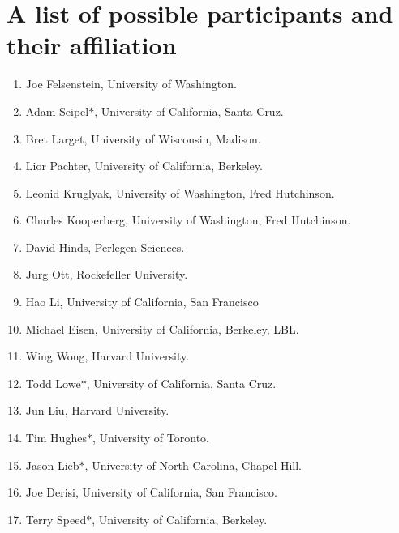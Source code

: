 \documentclass[12pt]{amsart}
\begin{document}
\section*{A list of possible participants and their affiliation}
\begin{enumerate}
\item Joe Felsenstein, University of Washington.

\item Adam Seipel$\mathbf{*}$, University of California, Santa Cruz.

\item Bret Larget, University of Wisconsin, Madison.

\item Lior Pachter, University of California, Berkeley.

\item Leonid Kruglyak, University of Washington, Fred Hutchinson.

\item Charles Kooperberg, University of Washington, Fred
Hutchinson.

\item David Hinds, Perlegen Sciences.

\item Jurg Ott, Rockefeller University.

\item Hao Li, University of California, San Francisco

\item Michael Eisen, University of California, Berkeley, LBL.

\item Wing Wong, Harvard University.

\item Todd Lowe$\mathbf{*}$, University of California, Santa Cruz.

\item Jun Liu, Harvard University.

\item Tim Hughes$\mathbf{*}$, University of Toronto.

\item Jason Lieb$\mathbf{*}$, University of North Carolina, Chapel Hill.

\item Joe Derisi, University of California, San Francisco.

\item Terry Speed$\mathbf{*}$, University of California, Berkeley.


\end{enumerate}
\end{document}
